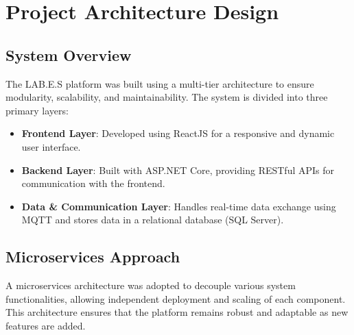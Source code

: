 \section{Project Architecture Design}

\subsection{System Overview}
The LAB.E.S platform was built using a multi-tier architecture to ensure modularity, scalability, and maintainability. The system is divided into three primary layers:
\begin{itemize}
    \item \textbf{Frontend Layer}: Developed using ReactJS for a responsive and dynamic user interface.
    \item \textbf{Backend Layer}: Built with ASP.NET Core, providing RESTful APIs for communication with the frontend.
    \item \textbf{Data \& Communication Layer}: Handles real-time data exchange using MQTT and stores data in a relational database (SQL Server).
\end{itemize}


\subsection{Microservices Approach}
A microservices architecture was adopted to decouple various system functionalities, allowing independent deployment and scaling of each component. This architecture ensures that the platform remains robust and adaptable as new features are added.
\clearpage